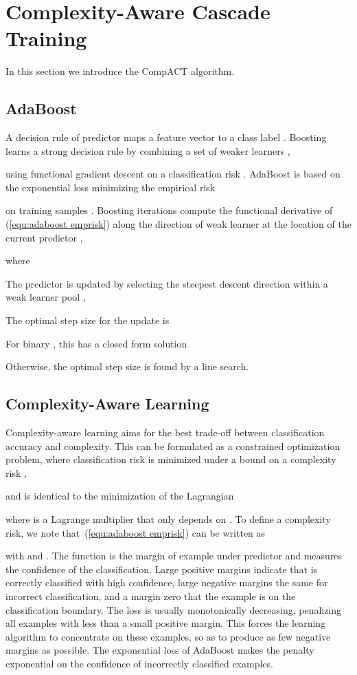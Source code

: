 \documentclass[10pt,twocolumn,letterpaper]{article}
\begin{document}
\section{Complexity-Aware Cascade Training}
\label{sec:complextiy-aware cascade}

In this section we introduce the CompACT algorithm.

\subsection{AdaBoost}

A decision rule  of predictor  maps a
feature vector  to a class label .
Boosting learns a strong decision rule by combining a set of weaker
learners ,

using functional gradient descent on a classification risk
\cite{DBLP:journals/AS/Friedman00,DBLP:conf/nips/MasonBBF99}.
AdaBoost \cite{DBLP:conf/eurocolt/FreundS95} is based on the exponential
loss  minimizing the empirical risk

on training samples .
Boosting iterations compute the functional derivative of (\ref{equ:adaboost emprisk}) along the direction of weak learner  at the location of the
current predictor ,

where

The predictor is updated by selecting the steepest descent direction
within a weak learner pool ,

The optimal step size for the update is

For binary , this has a closed form solution

Otherwise, the optimal step size is found by a line search.


\subsection{Complexity-Aware Learning}

Complexity-aware learning aims for the best trade-off
between classification accuracy and complexity. This can be
formulated as a constrained optimization problem,
where classification risk is minimized under a bound on a complexity
risk ,

and is identical to the minimization of the Lagrangian

where  is a Lagrange multiplier that only depends on .
To define a complexity risk, we note that~(\ref{equ:adaboost emprisk})
can be written as

with  and . The function 
is the margin of example  under predictor  and measures
the confidence of the classification. Large positive margins indicate
that  is correctly classified with high confidence, large negative
margins the same for incorrect classification, and a margin zero that
the example is on the classification boundary. The loss
 is usually monotonically decreasing, penalizing all examples with
less than a small positive margin. This forces the learning algorithm
to concentrate on these examples, so as to produce as few negative margins
as possible. The exponential loss of AdaBoost makes the penalty exponential
on the confidence of incorrectly classified examples.
\end{document}
